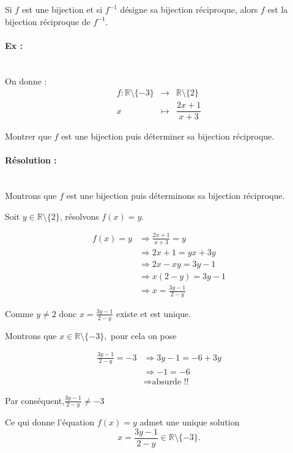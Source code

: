 \documentclass[12pt,a4paper]{article}
\begin{document}
Si $f$ est une bijection et si $f^{-1}$ désigne sa bijection réciproque, alors $f$ est la bijection réciproque de $f^{-1}$.

\paragraph{\color{darkred} Ex :}~\\

On donne :
\[
\begin{array}{rcl}
f:\mathbb{R}\setminus\{-3\} & \longrightarrow &
\mathbb{R}\setminus\{2\}\\
x & \longmapsto &
\dfrac{2x+1}{x+3}
\end{array}
\]

Montrer que $f$ est une bijection puis déterminer sa bijection
réciproque.

\paragraph{\color{darkred} Résolution :}~\\

Montrons que $f$ est une bijection puis déterminons sa bijection
réciproque.

Soit $y\in\mathbb{R}\setminus\{2\}$, résolvons $f(x)=y$.

\[
\begin{aligned}
f(x)=y &\Longrightarrow \frac{2x+1}{x+3}=y\\
       &\Longrightarrow 2x+1=yx+3y \\
       &\Longrightarrow 2x-xy=3y-1\\
       &\Longrightarrow x(2-y)=3y-1\\
       &\Longrightarrow x=\frac{3y-1}{2-y}
\end{aligned}
\]

Comme $y\neq2$ donc $x=\frac{3y-1}{2-y}$ existe et est unique.

Montrons que $ x\in\mathbb{R}\setminus\{-3\}, $
pour cela on pose

\[
\begin{aligned}
\frac{3y-1}{2-y}=-3 &\Longrightarrow 3y-1=-6+3y\\
       &\Longrightarrow -1=-6 \\
       &\Longrightarrow \text{absurde !!}
\end{aligned}
\]

Par conséquent,$ \frac{3y-1}{2-y}\neq-3 $

Ce qui donne l'équation $f(x)=y$ admet une unique solution
\[
x=\frac{3y-1}{2-y}\in\mathbb{R}\setminus\{-3\}.
\]
\end{document}
